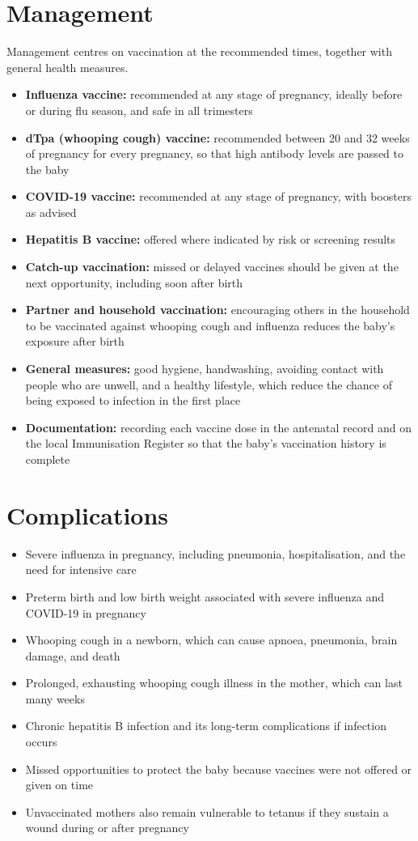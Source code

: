 \section*{Management}
Management centres on vaccination at the recommended times, together with general health measures.

\begin{itemize}
    \item \textbf{Influenza vaccine:} recommended at any stage of pregnancy, ideally before or during flu season, and safe in all trimesters
    \item \textbf{dTpa (whooping cough) vaccine:} recommended between 20 and 32 weeks of pregnancy for every pregnancy, so that high antibody levels are passed to the baby
    \item \textbf{COVID-19 vaccine:} recommended at any stage of pregnancy, with boosters as advised
    \item \textbf{Hepatitis B vaccine:} offered where indicated by risk or screening results
    \item \textbf{Catch-up vaccination:} missed or delayed vaccines should be given at the next opportunity, including soon after birth
    \item \textbf{Partner and household vaccination:} encouraging others in the household to be vaccinated against whooping cough and influenza reduces the baby's exposure after birth
    \item \textbf{General measures:} good hygiene, handwashing, avoiding contact with people who are unwell, and a healthy lifestyle, which reduce the chance of being exposed to infection in the first place
    \item \textbf{Documentation:} recording each vaccine dose in the antenatal record and on the local Immunisation Register so that the baby's vaccination history is complete
\end{itemize}

\section*{Complications}
\begin{itemize}
    \item Severe influenza in pregnancy, including pneumonia, hospitalisation, and the need for intensive care
    \item Preterm birth and low birth weight associated with severe influenza and COVID-19 in pregnancy
    \item Whooping cough in a newborn, which can cause apnoea, pneumonia, brain damage, and death
    \item Prolonged, exhausting whooping cough illness in the mother, which can last many weeks
    \item Chronic hepatitis B infection and its long-term complications if infection occurs
    \item Missed opportunities to protect the baby because vaccines were not offered or given on time
    \item Unvaccinated mothers also remain vulnerable to tetanus if they sustain a wound during or after pregnancy
\end{itemize}

